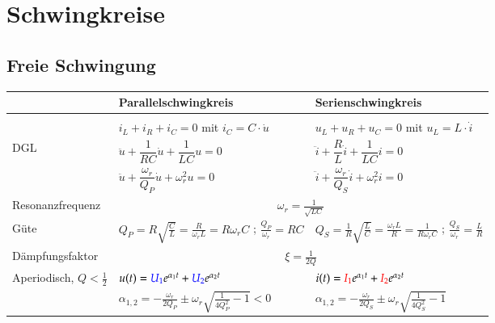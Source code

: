\section{Schwingkreise}
\subsection{Freie Schwingung}
\renewcommand{\arraystretch}{2}
\begin{tabular}{| p{3.5cm} | p{7.5cm} | p{7cm} |}
	\hline
		& \textbf{Parallelschwingkreis} 
		& \textbf{Serienschwingkreis} \\
	\hline
	& 
	& \\
	& $i_L + i_R + i_C = 0$ \hspace{0.3cm} mit $i_C = C\cdot\dot{u}$
	& $u_L + u_R + u_C = 0$ \hspace{0.3cm} mit $u_L = L\cdot\dot{i}$\\
	\hline	
	DGL &
  $\ddot{u} + \dfrac{1}{RC} \dot{u} + \dfrac{1}{LC} u = 0$
  & $\ddot{i} + \dfrac{R}{L} \dot{i} + \dfrac{1}{LC} i = 0$\\
  & $\ddot{u} + \dfrac{\omega_r}{Q_P} \dot{u} + \omega_r^2 u = 0$
  & $\ddot{i} + \dfrac{\omega_r}{Q_S} \dot{i} + \omega_r^2 i = 0$\\
	\hline
	Resonanzfrequenz & \multicolumn{2}{c|}{$\omega_r =
	\frac{1}{\sqrt{LC}}$} \\
	\hline
	Güte & 
	$Q_P = R\sqrt{\frac{C}{L}} = \frac{R}{\omega_r L}=R\omega_rC$ ; \hspace{0.5cm} $\frac{Q_P}{\omega_r}=RC$ &
	$Q_S = \frac{1}{R}\sqrt{\frac{L}{C}} = \frac{\omega_r
	L}{R}=\frac{1}{R\omega_rC}$ ; \hspace{0.5cm} $\frac{Q_S}{\omega_r}=\frac{L}{R}$\\
	\hline
	Dämpfungsfaktor & \multicolumn{2}{c|}{$\xi=\frac{1}{2Q}$} \\
	\hline
	Aperiodisch, $ Q < \frac{1}{2}$
		& $u(t) = \textcolor{blue}{U_1} e^{\alpha_1 t} + \textcolor{blue}{U_2} e^{\alpha_2 t}$ 
		& $i(t) = \textcolor{red}{I_1} e^{\alpha_1 t} + \textcolor{red}{I_2} e^{\alpha_2 t}$ \\
	\centering{$\alpha_1,\alpha_2$ reel}	
		& $\alpha_{1,2} = - \frac{\omega_r}{2 Q_P} \pm \omega_r \sqrt{\frac{1}{4 Q_P^2} - 1} <0$	
		& $\alpha_{1,2} = - \frac{\omega_r}{2 Q_S} \pm \omega_r \sqrt{\frac{1}{4Q_S^2} - 1}$
		\vspace{0.1cm}
		\\
	\hline 	

\end{tabular}
